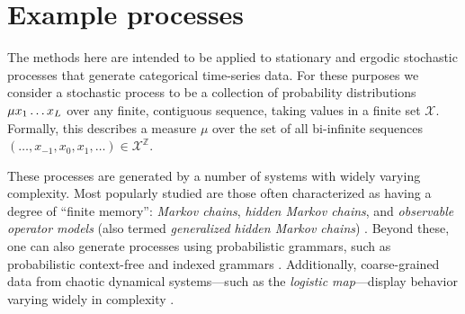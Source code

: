 \documentclass[sigconf, anonymous, review]{acmart}
\begin{document}
\section{Example processes}

The methods here are intended to be applied to stationary and ergodic
stochastic processes that generate categorical time-series data. For these
purposes we consider a stochastic process to be a collection of probability
distributions $\Prob{\mu}{x_1\dots x_L}$ over any finite, contiguous sequence,
taking values in a finite set $\mathcal{X}$. Formally, this describes a measure
$\mu$ over the set of all bi-infinite sequences $(\dots,x_{-1},x_0,x_1,\dots)
\in \mathcal{X}^{\mathbb{Z}}$.

These processes are generated by a number of systems with widely varying
complexity. Most popularly studied are those often characterized as having a
degree of ``finite memory'': \emph{Markov chains}, \emph{hidden Markov chains},
and \emph{observable operator models} (also termed \emph{generalized hidden
Markov chains}) \cite{Uppe97a,Jaeg00a}. Beyond these, one can also generate
processes using probabilistic grammars, such as probabilistic context-free and
indexed grammars \cite{Gema00a}. Additionally, coarse-grained data from chaotic
dynamical systems---such as the \emph{logistic map}---display behavior varying
widely in complexity \cite{Crut92c}.
\end{document}
